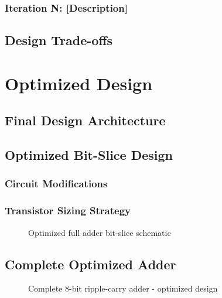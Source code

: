 \documentclass[12pt,letterpaper]{article}
\begin{document}
\subsubsection{Iteration N: [Description]}

\subsection{Design Trade-offs}


\section{Optimized Design}
\label{sec:optimized}


\subsection{Final Design Architecture}

\subsection{Optimized Bit-Slice Design}

\subsubsection{Circuit Modifications}

\subsubsection{Transistor Sizing Strategy}

\begin{figure}[H]
    \centering
    \caption{Optimized full adder bit-slice schematic}
    \label{fig:optimized_bitslice}
\end{figure}

\subsection{Complete Optimized Adder}

\begin{figure}[H]
    \centering
    \caption{Complete 8-bit ripple-carry adder - optimized design}
    \label{fig:optimized_8bit}
\end{figure}
\end{document}

